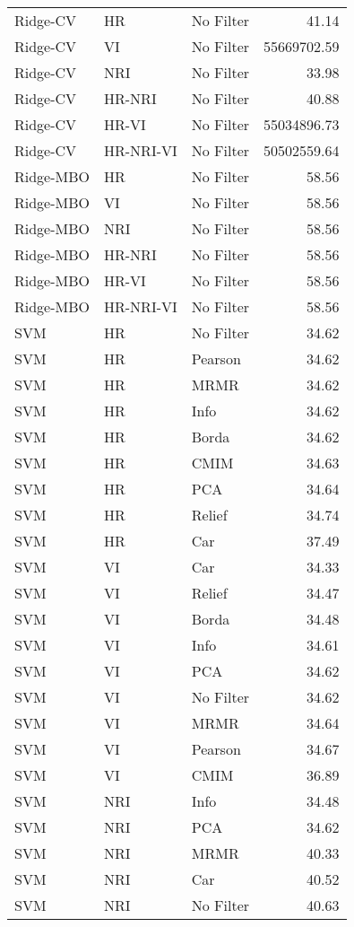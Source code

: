 \begin{longtable}{lllr}
  Ridge-CV & HR & No Filter & 41.14 \\ 
  Ridge-CV & VI & No Filter & 55669702.59 \\ 
  Ridge-CV & NRI & No Filter & 33.98 \\ 
  Ridge-CV & HR-NRI & No Filter & 40.88 \\ 
  Ridge-CV & HR-VI & No Filter & 55034896.73 \\ 
  Ridge-CV & HR-NRI-VI & No Filter & 50502559.64 \\ 
  Ridge-MBO & HR & No Filter & 58.56 \\ 
  Ridge-MBO & VI & No Filter & 58.56 \\ 
  Ridge-MBO & NRI & No Filter & 58.56 \\ 
  Ridge-MBO & HR-NRI & No Filter & 58.56 \\ 
  Ridge-MBO & HR-VI & No Filter & 58.56 \\ 
  Ridge-MBO & HR-NRI-VI & No Filter & 58.56 \\ 
  SVM & HR & No Filter & 34.62 \\ 
  SVM & HR & Pearson & 34.62 \\ 
  SVM & HR & MRMR & 34.62 \\ 
  SVM & HR & Info & 34.62 \\ 
  SVM & HR & Borda & 34.62 \\ 
  SVM & HR & CMIM & 34.63 \\ 
  SVM & HR & PCA & 34.64 \\ 
  SVM & HR & Relief & 34.74 \\ 
  SVM & HR & Car & 37.49 \\ 
  SVM & VI & Car & 34.33 \\ 
  SVM & VI & Relief & 34.47 \\ 
  SVM & VI & Borda & 34.48 \\ 
  SVM & VI & Info & 34.61 \\ 
  SVM & VI & PCA & 34.62 \\ 
  SVM & VI & No Filter & 34.62 \\ 
  SVM & VI & MRMR & 34.64 \\ 
  SVM & VI & Pearson & 34.67 \\ 
  SVM & VI & CMIM & 36.89 \\ 
  SVM & NRI & Info & 34.48 \\ 
  SVM & NRI & PCA & 34.62 \\ 
  SVM & NRI & MRMR & 40.33 \\ 
  SVM & NRI & Car & 40.52 \\ 
  SVM & NRI & No Filter & 40.63 \\ 

\end{longtable}

